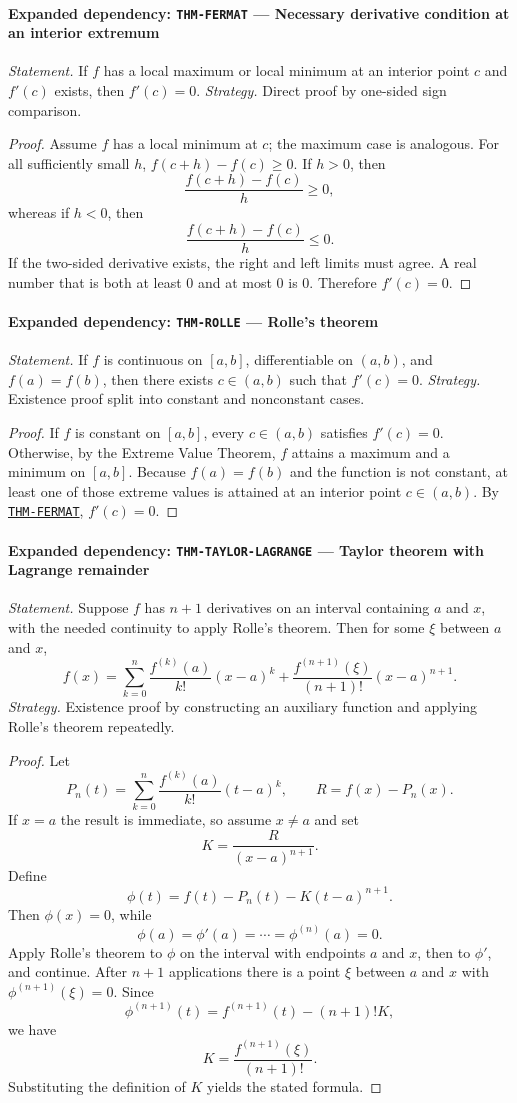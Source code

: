 \documentclass[10pt]{article}
\newcommand{\pidraw}[1]{\begingroup\urlstyle{tt}\nolinkurl{#1}\endgroup}
\newcommand{\pidref}[1]{\hyperref[prf:#1]{\pidraw{#1}}}
\newcommand{\pid}[1]{\pidref{#1}}
\theoremstyle{definition}
\theoremstyle{remark}
\begin{document}
\paragraph{Expanded dependency: \pidraw{THM-FERMAT} --- Necessary derivative condition at an interior extremum}
\textit{Statement.} If $f$ has a local maximum or local minimum at an interior point $c$ and $f'(c)$ exists, then $f'(c)=0$.
\textit{Strategy.} Direct proof by one-sided sign comparison.
\begin{proof}Assume $f$ has a local minimum at $c$; the maximum case is analogous.
For all sufficiently small $h$,
$f(c+h)-f(c)\ge0$. If $h>0$, then
\[
\frac{f(c+h)-f(c)}{h}\ge0,
\]
whereas if $h<0$, then
\[
\frac{f(c+h)-f(c)}{h}\le0.
\]
If the two-sided derivative exists, the right and left limits must agree.
A real number that is both at least $0$ and at most $0$ is $0$.
Therefore $f'(c)=0$.\end{proof}

\paragraph{Expanded dependency: \pidraw{THM-ROLLE} --- Rolle's theorem}
\textit{Statement.} If $f$ is continuous on $[a,b]$, differentiable on $(a,b)$, and $f(a)=f(b)$, then there exists $c\in(a,b)$ such that $f'(c)=0$.
\textit{Strategy.} Existence proof split into constant and nonconstant cases.
\begin{proof}If $f$ is constant on $[a,b]$, every $c\in(a,b)$ satisfies $f'(c)=0$.
Otherwise, by the Extreme Value Theorem, $f$ attains a maximum and a minimum
on $[a,b]$. Because $f(a)=f(b)$ and the function is not constant, at least one
of those extreme values is attained at an interior point $c\in(a,b)$.
By \pid{THM-FERMAT}, $f'(c)=0$.\end{proof}

\paragraph{Expanded dependency: \pidraw{THM-TAYLOR-LAGRANGE} --- Taylor theorem with Lagrange remainder}
\textit{Statement.} Suppose $f$ has $n+1$ derivatives on an interval containing $a$ and $x$, with the needed continuity to apply Rolle's theorem. Then for some $\xi$ between $a$ and $x$,
\[
f(x)=\sum_{k=0}^{n}\frac{f^{(k)}(a)}{k!}(x-a)^k
+\frac{f^{(n+1)}(\xi)}{(n+1)!}(x-a)^{n+1}.
\]
\textit{Strategy.} Existence proof by constructing an auxiliary function and applying Rolle's theorem repeatedly.
\begin{proof}Let
\[
P_n(t)=\sum_{k=0}^{n}\frac{f^{(k)}(a)}{k!}(t-a)^k,
\qquad
R=f(x)-P_n(x).
\]
If $x=a$ the result is immediate, so assume $x\ne a$ and set
\[
K=\frac{R}{(x-a)^{n+1}}.
\]
Define
\[
\phi(t)=f(t)-P_n(t)-K(t-a)^{n+1}.
\]
Then $\phi(x)=0$, while
\[
\phi(a)=\phi'(a)=\cdots=\phi^{(n)}(a)=0.
\]
Apply Rolle's theorem to $\phi$ on the interval with endpoints $a$ and $x$,
then to $\phi'$, and continue. After $n+1$ applications there is a point
$\xi$ between $a$ and $x$ with $\phi^{(n+1)}(\xi)=0$. Since
\[
\phi^{(n+1)}(t)=f^{(n+1)}(t)-(n+1)!K,
\]
we have
\[
K=\frac{f^{(n+1)}(\xi)}{(n+1)!}.
\]
Substituting the definition of $K$ yields the stated formula.\end{proof}
\end{document}
